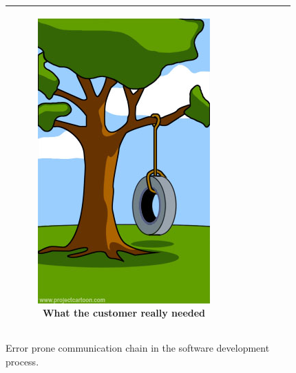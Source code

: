 \begin{figure}[h]
\begin{center}
\begin{tabular}{|c|c|c|c|c|c|}
\begin{subfigure}[t]{0.15\textwidth}\centering\includegraphics[width=0.9\columnwidth]{images/whatneeded}
\caption*{\tiny \centering What the customer really needed}\label{fig:whatneeded}\end{subfigure}\\
\hline
\end{tabular}
\caption{Error prone communication chain in the software development process.}
\label{fig:swingexample}
\end{center}
\end{figure}
